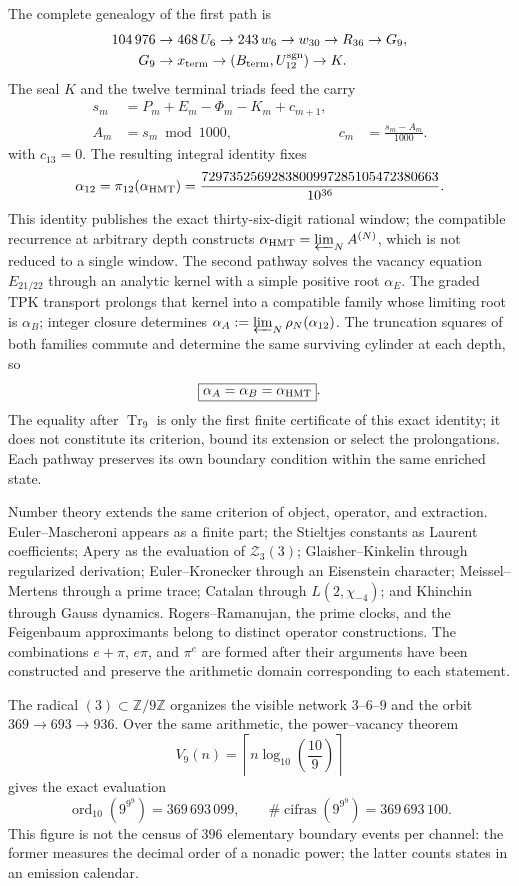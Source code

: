 The complete genealogy of the first path is
\[
 \begin{aligned}
 104\,976&\to468\,U_6\to243\,w_6\to w_{30}\to R_{36}\to G_9,\\
 G_9&\to x_{\rm term}\to(B_{\rm term},U_{12}^{\rm sgn})\to K.
 \end{aligned}
\]
The seal \(K\) and the twelve terminal triads feed the carry
\[
 \begin{aligned}
 s_m&=P_m+E_m-\Phi_m-K_m+c_{m+1},\\
 A_m&=s_m\bmod1000,
 &c_m&=\frac{s_m-A_m}{1000}.
 \end{aligned}
\]
with \(c_{13}=0\). The resulting integral identity fixes
\[
 \alpha_{12}=\pi_{12}(\alpha_{\rm HMT})
 =\frac{7297352569283800997285105472380663}{10^{36}}.
\]
This identity publishes the exact thirty-six-digit rational window;
the compatible recurrence at arbitrary depth constructs
\(\alpha_{\rm HMT}=\varprojlim_N A^{(N)}\), which is not reduced to a single
window. The second pathway solves the vacancy equation \(E_{21/22}\)
through an analytic kernel with a simple positive root \(\alpha_E\). The
graded TPK transport prolongs that kernel into a compatible family
whose limiting root is \(\alpha_B\); integer closure determines
\(\alpha_A:=\varprojlim_N\rho_N(\alpha_{12})\). The truncation squares
of both families commute and determine the same surviving cylinder at
each depth, so
\[
 \boxed{\alpha_A=\alpha_B=\alpha_{\rm HMT}}.
\]
The equality after \(\operatorname{Tr}_9\) is only the first finite
certificate of this exact identity; it does not constitute its criterion, bound its
extension or select the prolongations. Each pathway preserves its own boundary
condition within the same enriched state.

Number theory extends the same criterion of object, operator, and
extraction. Euler--Mascheroni appears as a finite part; the Stieltjes constants
as Laurent coefficients; Apery as the evaluation of
\(\mathcal Z_3(3)\); Glaisher--Kinkelin through regularized derivation;
Euler--Kronecker through an Eisenstein character; Meissel--Mertens through a
prime trace; Catalan through \(L(2,\chi_{-4})\); and Khinchin through
Gauss dynamics. Rogers--Ramanujan, the prime clocks, and the Feigenbaum
approximants belong to distinct operator constructions. The
combinations \(e+\pi\), \(e\pi\), and \(\pi^e\) are formed after their
arguments have been constructed and preserve the arithmetic domain
corresponding to each statement.

The radical \((3)\subset\mathbb Z/9\mathbb Z\) organizes the visible network
\(3\)--\(6\)--\(9\) and the orbit \(369\to693\to936\). Over the same
arithmetic, the power--vacancy theorem
\[
 V_9(n)=\left\lceil n\log_{10}\!\left(\frac{10}{9}\right)\right\rceil
\]
gives the exact evaluation
\[
 \operatorname{ord}_{10}\!\left(9^{9^9}\right)=369\,693\,099,
 \qquad
 \#\operatorname{cifras}\!\left(9^{9^9}\right)=369\,693\,100.
\]
This figure is not the census of \(396\) elementary boundary events per
channel: the former measures the
decimal order of a nonadic power; the latter counts states in an
emission calendar.

